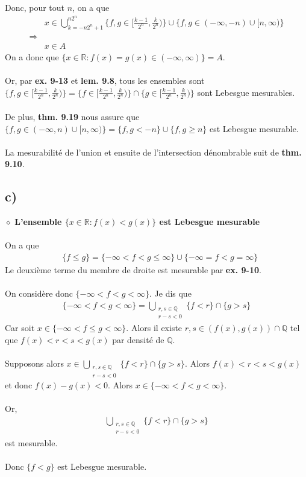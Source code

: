 \documentclass[a4paper,10pt]{article}
\begin{document}
\\
\\
Donc, pour tout $n$, on a que 
\begin{align*}
	& x \in \bigcup_{k = -n2^n + 1}^{n2^n} \{f,g \in [\frac{k-1}{2^n}, \frac{k}{2^n}) \} \cup \{f,g \in (-\infty, -n) \cup [n, \infty)\} \\
	\Rightarrow \\
	& x \in A
\end{align*}
On a donc que $\{x \in \mathbb{R} : f(x) = g(x) \in (-\infty, \infty)\} = A$.
\\
\\
Or, par \textbf{ex. 9-13} et \textbf{lem. 9.8}, tous les ensembles sont $\{f,g \in [\frac{k-1}{2^n}, \frac{k}{2^n})\} = \{f \in [\frac{k-1}{2^n}, \frac{k}{2^n}) \} \cap \{g \in [\frac{k-1}{2^n}, \frac{k}{2^n}) \}$ sont Lebesgue mesurables.    
\\
\\
De plus, \textbf{thm. 9.19} nous assure que $\{f,g \in (-\infty, n) \cup [n, \infty)\} = \{f,g < -n\} \cup \{f,g \geq n\}$ est Lebesgue mesurable.
\\
\\
La mesurabilité de l'union et ensuite de l'intersection dénombrable suit de \textbf{thm. 9.10}.

\subsection*{c)}
$\diamond$ \textbf{L'ensemble $\{x \in \mathbb{R} : f(x) < g(x)\}$ est Lebesgue mesurable}
\\
\\
On a que 
\begin{align*}
	& \{f \leq g \} = \{-\infty < f < g \leq \infty\} \cup \{-\infty = f < g = \infty \}
\end{align*}
Le deuxième terme du membre de droite est mesurable par \textbf{ex. 9-10}.
\\
\\
On considère donc $\{-\infty < f < g < \infty\}$. Je dis que 
\begin{align*}
	\{-\infty < f < g < \infty \} = \bigcup_{\substack{ r,s \in \mathbb{Q} \\ r - s < 0}} \{f < r\} \cap \{g > s\}
\end{align*}
Car soit $x \in \{-\infty < f \leq g < \infty\}$. Alors il existe $r,s \in (f(x), g(x)) \cap \mathbb{Q}$ tel que $f(x) < r < s < g(x)$ par densité de $\mathbb{Q}$.
\\
\\
Supposons alors $x \in \bigcup_{\substack{r,s \in \mathbb{Q} \\ r-s < 0}} \{f < r\} \cap \{g > s\}$. Alors $f(x) < r < s < g(x)$ et donc $f(x) - g(x) < 0$. Alors $x \in \{-\infty < f < g < \infty\}$.
\\
\\
Or, 
\begin{align*}
	\bigcup_{\substack{r,s \in \mathbb{Q} \\ r-s < 0}} \{f < r\} \cap \{g > s\}
\end{align*} 
est mesurable.
\\
\\
Donc $\{f < g \}$ est Lebesgue mesurable.
\end{document}
